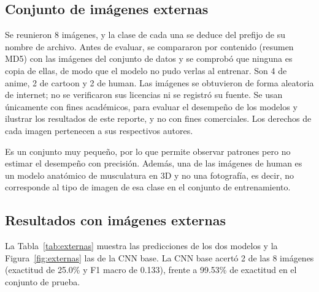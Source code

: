 \documentclass[letterpaper, 10 pt]{IEEEconf}
\begin{document}
\subsection{Conjunto de imágenes externas}

Se reunieron 8 imágenes, y la clase de cada una se deduce del prefijo de su nombre de archivo. Antes de evaluar, se compararon por contenido (resumen MD5) con las imágenes del conjunto de datos y se comprobó que ninguna es copia de ellas, de modo que el modelo no pudo verlas al entrenar. Son 4 de anime, 2 de cartoon y 2 de human. Las imágenes se obtuvieron de forma aleatoria de internet; no se verificaron sus licencias ni se registró su fuente. Se usan únicamente con fines académicos, para evaluar el desempeño de los modelos y ilustrar los resultados de este reporte, y no con fines comerciales. Los derechos de cada imagen pertenecen a sus respectivos autores.

Es un conjunto muy pequeño, por lo que permite observar patrones pero no estimar el desempeño con precisión. Además, una de las imágenes de human es un modelo anatómico de musculatura en 3D y no una fotografía, es decir, no corresponde al tipo de imagen de esa clase en el conjunto de entrenamiento.

\subsection{Resultados con imágenes externas}

La Tabla~\ref{tab:externas} muestra las predicciones de los dos modelos y la Figura~\ref{fig:externas} las de la CNN base. La CNN base acertó 2 de las 8 imágenes (exactitud de 25.0\% y F1 macro de 0.133), frente a 99.53\% de exactitud en el conjunto de prueba.
\end{document}
